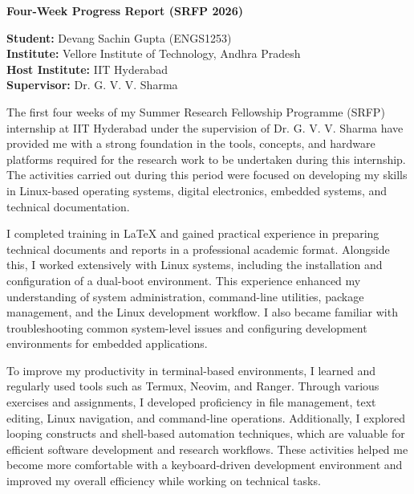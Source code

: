 \documentclass[12pt, a4paper]{article}
\begin{document}
\begin{center}
    \LARGE\textbf{Four-Week Progress Report (SRFP 2026)}
\end{center}
\vspace{0.2cm}


\begin{tcolorbox}[
    colback=black!3,       
    colframe=black!70,     
    boxrule=0.8pt,         
    arc=4pt,              
    top=12pt,
    bottom=12pt,
    left=15pt,
    right=15pt
]
    \large
    \textbf{Student:} Devang Sachin Gupta (ENGS1253) \\
    \textbf{Institute:} Vellore Institute of Technology, Andhra Pradesh \\
    \textbf{Host Institute:} IIT Hyderabad \\
    \textbf{Supervisor:} Dr. G. V. V. Sharma
\end{tcolorbox}

\vspace{0.4cm}


The first four weeks of my Summer Research Fellowship Programme (SRFP) internship at IIT Hyderabad under the supervision of Dr. G. V. V. Sharma have provided me with a strong foundation in the tools, concepts, and hardware platforms required for the research work to be undertaken during this internship. The activities carried out during this period were focused on developing my skills in Linux-based operating systems, digital electronics, embedded systems, and technical documentation.

I completed training in LaTeX{} and gained practical experience in preparing technical documents and reports in a professional academic format. Alongside this, I worked extensively with Linux systems, including the installation and configuration of a dual-boot environment. This experience enhanced my understanding of system administration, command-line utilities, package management, and the Linux development workflow. I also became familiar with troubleshooting common system-level issues and configuring development environments for embedded applications.

To improve my productivity in terminal-based environments, I learned and regularly used tools such as Termux, Neovim, and Ranger. Through various exercises and assignments, I developed proficiency in file management, text editing, Linux navigation, and command-line operations. Additionally, I explored looping constructs and shell-based automation techniques, which are valuable for efficient software development and research workflows. These activities helped me become more comfortable with a keyboard-driven development environment and improved my overall efficiency while working on technical tasks.
\end{document}
